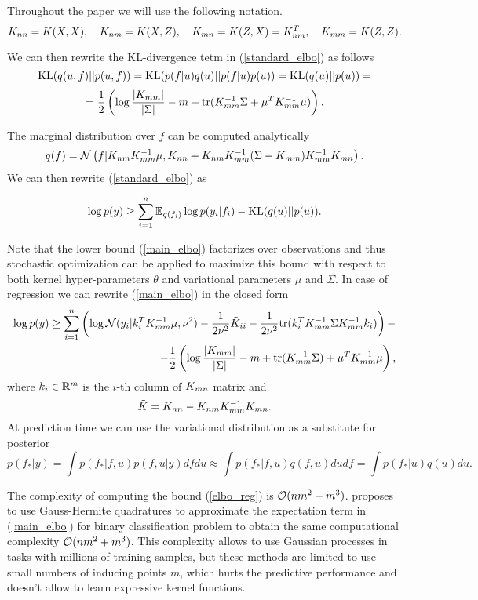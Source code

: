   Throughout the paper we will use the following notation.
  \[
    K_{nn} = K(X, X),~~~K_{nm} = K(X, Z),~~~K_{mn} = K(Z, X) = K_{nm}^T,~~~K_{mm} = K(Z, Z).
  \]

  We can then rewrite the KL-divergence tetm in (\ref{standard_elbo}) as follows
  \[
    \mbox{KL}(q(u, f) || p(u, f)) = \mbox{KL}(p(f | u) q(u) || p(f | u) p(u)) = \mbox{KL}(q(u) || p(u)) =
  \]
  \[
    = \frac 1 2 \left(\log \frac{|K_{mm}|}{|\Sigma|} - m + \mbox{tr}(K_{mm}^{-1} \Sigma + \mu^T K_{mm}^{-1} \mu) \right).
  \]

  The marginal distribution over $f$ can be computed analytically
  \[
    q(f) = \mathcal{N}\left(f | K_{nm} K_{mm}^{-1} \mu, K_{nn} + K_{nm} K_{mm}^{-1} (\Sigma - K_{mm}) K_{mm}^{-1} K_{mn}\right).
  \]
  We can then rewrite (\ref{standard_elbo}) as

  \begin{equation}
  \label{main_elbo}
    \log p(y) \ge \sum_{i=1}^n \mathbb{E}_{q(f_i)} \log p(y_i | f_i) - \mbox{KL}(q(u) || p(u)).
  \end{equation}

  Note that the lower bound (\ref{main_elbo}) factorizes over observations and 
  thus stochastic optimization can be applied to maximize this bound with respect
  to both kernel hyper-parameters $\theta$ and variational parameters $\mu$ and 
  $\Sigma$. In case of regression we can rewrite (\ref{main_elbo}) in the closed
  form
  \begin{equation}
    \label{elbo_reg}
    \begin{split}
      \log p(y) \ge 
      \sum_{i=1}^n \left ( \log \mathcal{N} (y_i | k_{i}^T K_{mm}^{-1} \mu, \nu^2) - 
        \frac 1 {2\nu^2} \tilde K_{ii} - 
        \frac 1 {2\nu^2} \mbox{tr} (k_{i}^T K_{mm}^{-1} \Sigma K_{mm}^{-1} k_{i})
      \right )-
      \\
      - \frac 1 2 \left(
        \log \frac {|K_{mm}|} {|\Sigma|} - m + \mbox{tr}(K_{mm}^{-1} \Sigma) +
        \mu^T K_{mm}^{-1} \mu
      \right),
    \end{split}
  \end{equation}
  where $k_{i} \in \mathbb{R}^m$ is the $i$-th column of $K_{mn}$ matrix and 
  \[
    \tilde{K} = K_{nn} - K_{nm} K_{mm}^{-1} K_{mn}.
  \]
  At prediction time we can use the variational distribution as a substitute for
  posterior
  \[
    p(f_* | y) = \int p(f_*| f, u) p(f, u |y) d f d u \approx 
    \int p(f_* | f, u) q(f, u) d u d f = \int p(f_* | u) q(u) du.
  \]

  The complexity of computing the bound (\ref{elbo_reg}) is $\mathcal{O}(n m^2 + m^3)$.
  \citet{hensman2015} proposes to use Gauss-Hermite quadratures to approximate the
  expectation term in (\ref{main_elbo}) for binary classification problem to 
  obtain the same computational complexity $\mathcal{O}(nm^2 + m^3)$. This complexity
  allows to use Gaussian processes in tasks with millions of training samples,
  but these methods are limited to use small numbers of inducing points $m$, 
  which hurts the predictive performance and doesn't allow to learn expressive
  kernel functions.

